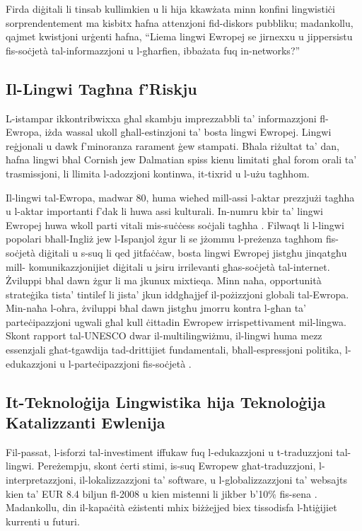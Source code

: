 \begin{multicols}{2}
Firda diġitali li tinsab kullimkien u li hija kkawżata minn konfini lingwistiċi sorprendentement ma kisbitx ħafna attenzjoni fid-diskors pubbliku; madankollu, qajmet kwistjoni urġenti ħafna, ``Liema lingwi Ewropej se jirnexxu u jippersistu fis-soċjetà tal-informazzjoni u l-għarfien, ibbażata fuq in-networks?''

\subsection{Il-Lingwi Tagħna f’Riskju}

L-istampar ikkontribwixxa għal skambju imprezzabbli ta’ informazzjoni fl-Ewropa, iżda wassal ukoll għall-estinzjoni ta’ bosta lingwi Ewropej. Lingwi reġjonali u dawk f’minoranza rarament ġew stampati. Bħala riżultat ta’ dan, ħafna lingwi bħal Cornish jew Dalmatian spiss kienu limitati għal forom orali ta’ trasmissjoni, li llimita l-adozzjoni kontinwa, it-tixrid u l-użu tagħhom.

  
Il-lingwi  tal-Ewropa, madwar 80, huma wieħed mill-assi l-aktar prezzjużi tagħha u l-aktar importanti f’dak li huwa assi kulturali. In-numru kbir ta’ lingwi Ewropej huwa wkoll parti vitali mis-suċċess soċjali tagħha \cite{EC2}.  Filwaqt li l-lingwi popolari bħall-Ingliż jew l-Ispanjol żgur li se jżommu l-preżenza tagħhom fis-soċjetà diġitali u s-suq li qed jitfaċċaw, bosta lingwi Ewropej jistgħu jinqatgħu mill- komunikazzjonijiet diġitali u jsiru irrilevanti għas-soċjetà tal-internet. Żviluppi bħal dawn żgur li ma jkunux mixtieqa. Minn naħa, opportunità strateġika tista’ tintilef li jista’ jkun iddgħajjef il-pożizzjoni globali tal-Ewropa. Min-naħa l-oħra, żviluppi bħal dawn jistgħu jmorru kontra l-għan ta’ parteċipazzjoni ugwali għal kull ċittadin Ewropew irrispettivament mil-lingwa. Skont rapport tal-UNESCO dwar il-multilingwiżmu, il-lingwi huma mezz essenzjali għat-tgawdija tad-drittijiet fundamentali, bħall-espressjoni politika, l-edukazzjoni u l-parteċipazzjoni fis-soċjetà \cite{Unesco1}.

\subsection{It-Teknoloġija Lingwistika hija Teknoloġija Katalizzanti Ewlenija}

Fil-passat, l-isforzi tal-investiment iffukaw fuq l-edukazzjoni u t-traduzzjoni tal-lingwi. Pereżempju, skont ċerti stimi, is-suq Ewropew għat-traduzzjoni, l-interpretazzjoni, il-lokalizzazzjoni ta’ software, u l-globalizzazzjoni ta’ websajts kien ta' EUR 8.4 biljun fl-2008 u kien mistenni li jikber b’10\% fis-sena \cite{EC3}.  Madankollu, din il-kapaċità eżistenti mhix biżżejjed biex tissodisfa l-ħtiġijiet kurrenti u futuri.
  

\end{multicols}
